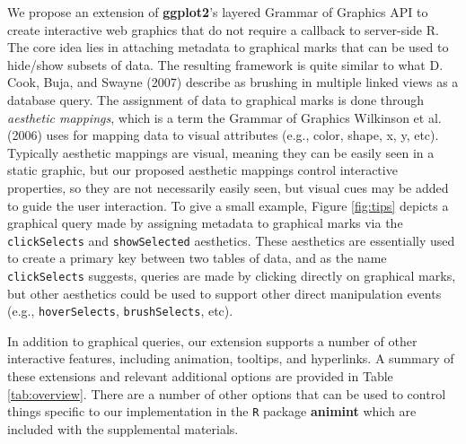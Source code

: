 \documentclass[12pt,]{article}
\theoremstyle{definition}
\theoremstyle{definition}
\theoremstyle{definition}
\theoremstyle{remark}
\begin{document}
We propose an extension of \textbf{ggplot2}'s layered Grammar of
Graphics API to create interactive web graphics that do not require a
callback to server-side R. The core idea lies in attaching metadata to
graphical marks that can be used to hide/show subsets of data. The
resulting framework is quite similar to what D. Cook, Buja, and Swayne
(2007) describe as brushing in multiple linked views as a database
query. The assignment of data to graphical marks is done through
\emph{aesthetic mappings}, which is a term the Grammar of Graphics
Wilkinson et al. (2006) uses for mapping data to visual attributes
(e.g., color, shape, x, y, etc). Typically aesthetic mappings are
visual, meaning they can be easily seen in a static graphic, but our
proposed aesthetic mappings control interactive properties, so they are
not necessarily easily seen, but visual cues may be added to guide the
user interaction. To give a small example, Figure \ref{fig:tips} depicts
a graphical query made by assigning metadata to graphical marks via the
\texttt{clickSelects} and \texttt{showSelected} aesthetics. These
aesthetics are essentially used to create a primary key between two
tables of data, and as the name \texttt{clickSelects} suggests, queries
are made by clicking directly on graphical marks, but other aesthetics
could be used to support other direct manipulation events (e.g.,
\texttt{hoverSelects}, \texttt{brushSelects}, etc).

In addition to graphical queries, our extension supports a number of
other interactive features, including animation, tooltips, and
hyperlinks. A summary of these extensions and relevant additional
options are provided in Table \ref{tab:overview}. There are a number of
other options that can be used to control things specific to our
implementation in the \texttt{R} package \textbf{animint} which are
included with the supplemental materials.
\end{document}
